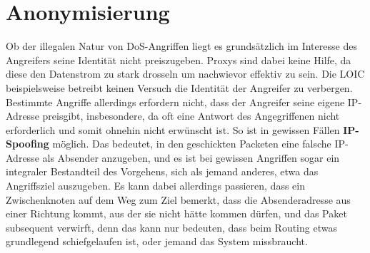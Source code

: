 \documentclass[12pt,a4paper]{article}
\begin{document}
\section{Anonymisierung}
Ob der illegalen Natur von DoS-Angriffen liegt es grundsätzlich im Interesse des Angreifers seine Identität nicht preiszugeben. Proxys sind dabei keine Hilfe, da diese den Datenstrom zu stark drosseln um nachwievor effektiv zu sein. Die LOIC beispielsweise betreibt keinen Versuch die Identität der Angreifer zu verbergen. Bestimmte Angriffe allerdings erfordern nicht, dass der Angreifer seine eigene IP-Adresse preisgibt, insbesondere, da oft eine Antwort des Angegriffenen nicht erforderlich und somit ohnehin nicht erwünscht ist. So ist in gewissen Fällen \textbf{IP-Spoofing} möglich. Das bedeutet, in den geschickten Packeten eine falsche IP-Adresse als Absender anzugeben, und es ist bei gewissen Angriffen sogar ein integraler Bestandteil des Vorgehens, sich als jemand anderes, etwa das Angriffsziel auszugeben. Es kann dabei allerdings passieren, dass ein Zwischenknoten auf dem Weg zum Ziel bemerkt, dass die Absenderadresse aus einer Richtung kommt, aus der sie nicht hätte kommen dürfen, und das Paket subsequent verwirft, denn das kann nur bedeuten, dass beim Routing etwas grundlegend schiefgelaufen ist, oder jemand das System missbraucht.
\end{document}
